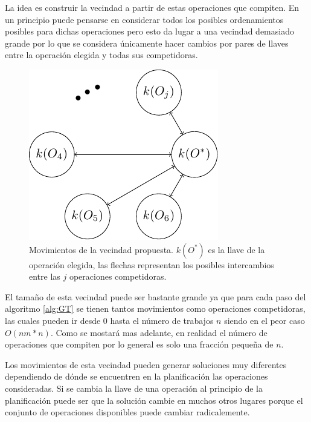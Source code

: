 La idea es construir la vecindad a partir de estas operaciones que compiten. En un principio puede pensarse en considerar todos los posibles ordenamientos posibles para dichas operaciones pero esto da lugar a una vecindad demasiado grande por lo que se considera únicamente hacer cambios por pares de llaves entre la operación elegida y todas sus competidoras.
\begin{figure}[H]
\centering
\includegraphics[scale=1.3]{Imagenes/vec2.pdf}
\caption{Movimientos de la vecindad propuesta. $k(O^*)$ es la llave de la operación elegida, las flechas representan los posibles intercambios entre las $j$ operaciones competidoras.}
\end{figure}

El tamaño de esta vecindad puede ser bastante grande ya que para cada paso del algoritmo \ref{alg:GT} se tienen tantos movimientos como operaciones competidoras, las cuales pueden ir desde 0 hasta el número de trabajos $n$ siendo en el peor caso $O(nm*n)$. Como se mostará mas adelante, en realidad el número de operaciones que compiten por lo general es solo una fracción pequeña de $n$.

Los movimientos de esta vecindad pueden generar soluciones muy diferentes dependiendo de dónde se encuentren en la planificación las operaciones consideradas. Si se cambia la llave de una operación al principio de la planificación puede ser que la solución cambie en muchos otros lugares porque el conjunto de operaciones disponibles puede cambiar radicalemente. 
